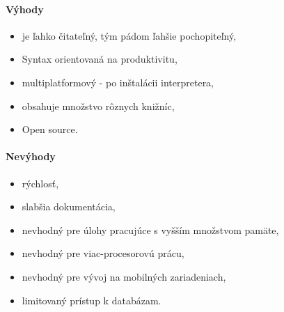 \paragraph{Výhody}
\begin{itemize}
	\item je ľahko čitateľný, tým pádom ľahšie pochopiteľný,
	\item Syntax orientovaná na produktivitu,
	\item multiplatformový - po inštalácii interpretera,
	\item obsahuje množstvo rôznych knižníc,
	\item Open source.
	\newline
\end{itemize}
\paragraph{Nevýhody}
\begin{itemize}
	\item rýchlosť,
	\item slabšia dokumentácia,
	\item nevhodný pre úlohy pracujúce s vyšším množstvom pamäte,
	\item nevhodný pre viac-procesorovú prácu,
	\item nevhodný pre vývoj na mobilných zariadeniach,
	\item limitovaný prístup k databázam.
	\newline
\end{itemize}

